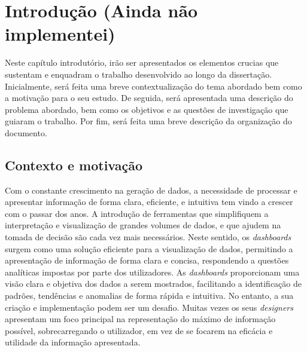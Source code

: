 
%

\chapter{Introdução (Ainda não implementei)}
\label{cha:introducao}

Neste capítulo introdutório, irão ser apresentados os elementos crucias que sustentam e enquadram o trabalho desenvolvido ao longo da dissertação. Inicialmente, será feita uma breve contextualização do tema abordado bem como a motivação para o seu estudo. De seguida, será apresentada uma descrição do problema abordado, bem como os objetivos e as questões de investigação que guiaram o trabalho. Por fim, será feita uma breve descrição da organização do documento.

\section{Contexto e motivação}
\label{sec:cont_e_motiv}

Com o constante crescimento na geração de dados, a necessidade de processar e apresentar informação de forma clara, eficiente, e intuitiva tem vindo a crescer com o passar dos anos. A introdução de ferramentas que simplifiquem a interpretação e visualização de grandes volumes de dados, e que ajudem na tomada de decisão são cada vez mais necessários. Neste sentido, os \textit{dashboards} surgem como uma solução eficiente para a visualização de dados, permitindo a apresentação de informação de forma clara e concisa, respondendo a questões analíticas impostas por parte dos utilizadores. As \textit{dashboards} proporcionam uma visão clara e objetiva dos dados a serem mostrados, facilitando a identificação de padrões, tendências e anomalias de forma rápida e intuitiva. No entanto, a sua criação e implementação podem ser um desafio. Muitas vezes os seus \textit{designers} apresentam um foco principal na representação do máximo de informação possível, sobrecarregando o utilizador, em vez de se focarem na eficácia e utilidade da informação apresentada. 

